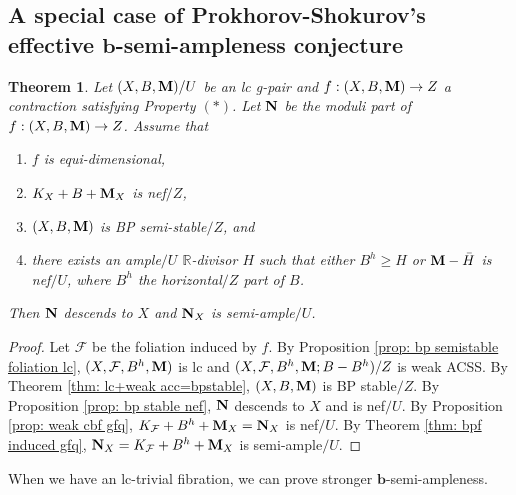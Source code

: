 \documentclass[11pt]{amsart}
\numberwithin{equation}{section}
\newcommand{\bb}{\bm{b}}
\newcommand{\Mm}{{\bf{M}}}
\newcommand{\Nn}{{\bf{N}}}
\newcommand{\Rr}{\mathbb{R}}
\newcommand{\Ff}{\mathcal{F}}
\newtheorem{thm}{Theorem}[subsection]
\theoremstyle{definition}
\theoremstyle{definition}
\theoremstyle{definition}
\begin{document}
\subsection{A special case of Prokhorov-Shokurov's effective \texorpdfstring{$\bb$}{}-semi-ampleness conjecture}


\begin{thm}\label{thm: a special b-semiampleness}
Let $(X,B,\Mm)/U$ be an lc g-pair and $f:(X,B,\Mm)\rightarrow Z$ a contraction satisfying Property $(*)$. Let $\Nn$ be the moduli part of $f: (X,B,\Mm)\rightarrow Z$. Assume that
\begin{enumerate}
  \item $f$ is equi-dimensional,
  \item $K_X+B+\Mm_X$ is nef$/Z$, 
  \item $(X,B,\Mm)$ is BP semi-stable$/Z$, and
  \item there exists an ample$/U$ $\Rr$-divisor $H$ such that either $B^h\geq H$ or $\Mm-\bar H$ is nef$/U$, where $B^h$ the horizontal$/Z$ part of $B$.
\end{enumerate}
Then $\Nn$ descends to $X$ and $\Nn_X$ is semi-ample$/U$.
\end{thm}
\begin{proof}
    Let $\Ff$ be the foliation induced by $f$. By Proposition \ref{prop: bp semistable foliation lc}, $(X,\Ff,B^h,\Mm)$ is lc and $(X,\Ff,B^h,\Mm;B-B^h)/Z$ is weak ACSS. By Theorem \ref{thm: lc+weak acc=bpstable}, $(X,B,\Mm)$ is BP stable$/Z$. By Proposition \ref{prop: bp stable nef}, $\Nn$ descends to $X$ and is nef$/U$. By Proposition \ref{prop: weak cbf gfq}, $K_{\Ff}+B^h+\Mm_X=\Nn_X$ is nef$/U$. By Theorem \ref{thm: bpf induced gfq}, $\Nn_X=K_{\Ff}+B^h+\Mm_X$ is semi-ample$/U$.
\end{proof}


When we have an lc-trivial fibration, we can prove stronger $\bb$-semi-ampleness.
\end{document}
